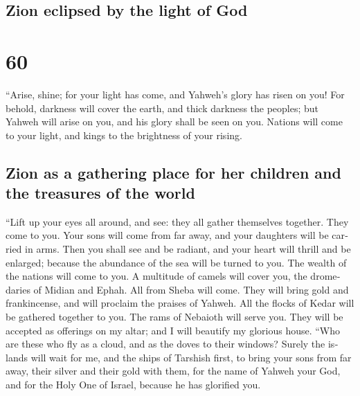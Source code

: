 \begin{paracol}{2}
\begin{otherlanguage}{english}
{\subsection{Zion eclipsed by the light of
God}\label{zion-eclipsed-by-the-light-of-god}}

\hypertarget{section-119}{%
\section{60}\label{section-119}}

 ``Arise, shine; for your light has come, and Yahweh's
glory has risen on you!  For behold, darkness will cover
the earth, and thick darkness the peoples; but Yahweh will arise on you,
and his glory shall be seen on you.  Nations will come to
your light, and kings to the brightness of your rising.

\hypertarget{zion-as-a-gathering-place-for-her-children-and-the-treasures-of-the-world}{%
\subsection{Zion as a gathering place for her children and the treasures
of the
world}\label{zion-as-a-gathering-place-for-her-children-and-the-treasures-of-the-world}}

 ``Lift up your eyes all around, and see: they all gather
themselves together. They come to you. Your sons will come from far
away, and your daughters will be carried in arms.  Then
you shall see and be radiant, and your heart will thrill and be
enlarged; because the abundance of the sea will be turned to you. The
wealth of the nations will come to you.  A multitude of
camels will cover you, the dromedaries of Midian and Ephah. All from
Sheba will come. They will bring gold and frankincense, and will
proclaim the praises of Yahweh.  All the flocks of Kedar
will be gathered together to you. The rams of Nebaioth will serve you.
They will be accepted as offerings on my altar; and I will beautify my
glorious house.  ``Who are these who fly as a cloud, and
as the doves to their windows?  Surely the islands will
wait for me, and the ships of Tarshish first, to bring your sons from
far away, their silver and their gold with them, for the name of Yahweh
your God, and for the Holy One of Israel, because he has glorified you.

\hypertarget{zion-honored-and-graced-as-mistress-of-the-world}{%
}
\end{otherlanguage}
\end{paracol}
